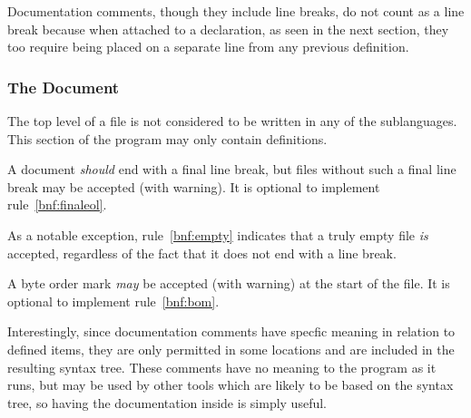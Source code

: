 Documentation comments, though they include line breaks, do not count as a line
break because when attached to a declaration, as seen in the next section, they
too require being placed on a separate line from any previous definition.

\subsubsection{The Document}

The top level of a \Trilogy{} file is not considered to be written in any
of the sublanguages. This section of the program may only contain definitions.

A \Trilogy{} document \emph{should} end with a final line break,
but files without such a final line break may be accepted (with warning).
It is optional to implement rule~\ref{bnf:finaleol}.

As a notable exception, rule~\ref{bnf:empty} indicates that a truly empty
file \emph{is} accepted, regardless of the fact that it does not end with
a line break.

A byte order mark \emph{may} be accepted (with warning) at the start of
the file. It is optional to implement rule~\ref{bnf:bom}.

Interestingly, since documentation comments have specfic meaning in relation
to defined items, they are only permitted in some locations and are included
in the resulting syntax tree. These comments have no meaning to the program
as it runs, but may be used by other tools which are likely to be based on the
syntax tree, so having the documentation inside is simply useful.

